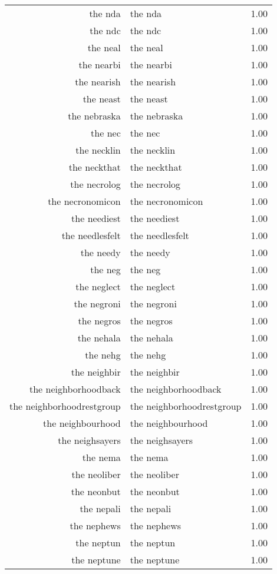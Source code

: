 \begin{table}[ht]
\begin{tabular}{rlr}
  the nda & the nda & 1.00 \\ 
  the ndc & the ndc & 1.00 \\ 
  the neal & the neal & 1.00 \\ 
  the nearbi & the nearbi & 1.00 \\ 
  the nearish & the nearish & 1.00 \\ 
  the neast & the neast & 1.00 \\ 
  the nebraska & the nebraska & 1.00 \\ 
  the nec & the nec & 1.00 \\ 
  the necklin & the necklin & 1.00 \\ 
  the neckthat & the neckthat & 1.00 \\ 
  the necrolog & the necrolog & 1.00 \\ 
  the necronomicon & the necronomicon & 1.00 \\ 
  the neediest & the neediest & 1.00 \\ 
  the needlesfelt & the needlesfelt & 1.00 \\ 
  the needy & the needy & 1.00 \\ 
  the neg & the neg & 1.00 \\ 
  the neglect & the neglect & 1.00 \\ 
  the negroni & the negroni & 1.00 \\ 
  the negros & the negros & 1.00 \\ 
  the nehala & the nehala & 1.00 \\ 
  the nehg & the nehg & 1.00 \\ 
  the neighbir & the neighbir & 1.00 \\ 
  the neighborhoodback & the neighborhoodback & 1.00 \\ 
  the neighborhoodrestgroup & the neighborhoodrestgroup & 1.00 \\ 
  the neighbourhood & the neighbourhood & 1.00 \\ 
  the neighsayers & the neighsayers & 1.00 \\ 
  the nema & the nema & 1.00 \\ 
  the neoliber & the neoliber & 1.00 \\ 
  the neonbut & the neonbut & 1.00 \\ 
  the nepali & the nepali & 1.00 \\ 
  the nephews & the nephews & 1.00 \\ 
  the neptun & the neptun & 1.00 \\ 
  the neptune & the neptune & 1.00 \\ 

\end{tabular}
\end{table}
